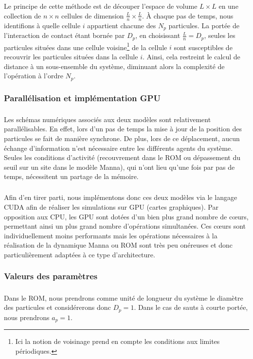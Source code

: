 \subparagraph{}Le principe de cette méthode est de découper l'espace de volume $L\times L$ en une collection de $ n \times n $ cellules de dimension $\frac{L}{n}\times \frac{L}{n}$. \`A chaque pas de temps, nous identifions à quelle cellule $i$ appartient chacune des $N_p$ particules. La portée de l'interaction de contact étant bornée par $D_p$, en choisissant $\frac{L}{n}=D_p$, seules les particules situées dans une cellule voisine\footnote{Ici la notion de voisinage prend en compte les conditions aux limites périodiques.} de la cellule $i$ sont susceptibles de recouvrir les particules situées dans la cellule $i$. Ainsi, cela restreint le calcul de distance à un sous-ensemble du système, diminuant alors la complexité de l'opération à l'ordre $N_p$.

\subsubsection{Parallélisation et implémentation GPU}

\subparagraph{}Les schémas numériques associés aux deux modèles sont relativement parallélisables. En effet, lors d'un pas de temps la mise à jour de la position des particules se fait de manière synchrone. De plus, lors de ce déplacement, aucun échange d'information n'est nécessaire entre les différents agents du système. Seules les conditions d'activité (recouvrement dans le ROM ou dépassement du seuil sur un site dans le modèle Manna), qui n'ont lieu qu'une fois par pas de temps, nécessitent un partage de la mémoire. 

\subparagraph{}Afin d'en tirer parti, nous implémentons donc ces deux modèles via le langage CUDA \cite{cuda} afin de réaliser les simulations sur GPU (cartes graphiques). Par opposition aux CPU, les GPU sont dotées d'un bien plus grand nombre de cœurs, permettant ainsi un plus grand nombre d'opérations simultanées. Ces cœurs sont individuellement moins performants mais les opérations nécessaires à la réalisation de la dynamique Manna ou ROM sont très peu onéreuses et donc particulièrement adaptées à ce type d'architecture.

\subsubsection{Valeurs des paramètres}

\subparagraph{}Dans le ROM, nous prendrons comme unité de longueur du système le diamètre des particules et considérerons donc $D_p=1$. Dans le cas de sauts à courte portée, nous prendrons $a_p=1$.

